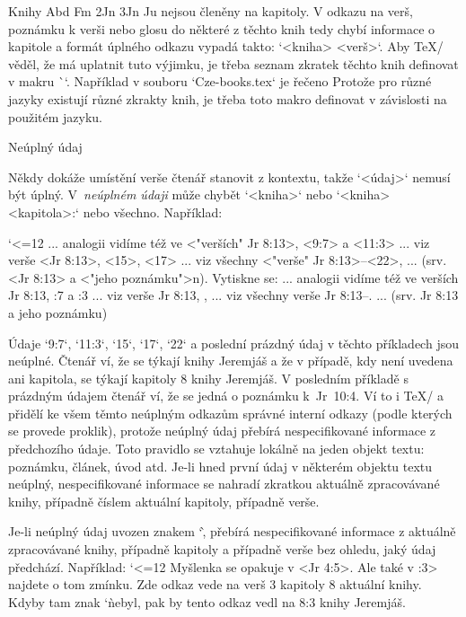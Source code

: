 Knihy Abd Fm 2Jn 3Jn Ju nejsou členěny na kapitoly. V odkazu na verš, poznámku
k verši nebo glosu do některé z těchto knih tedy chybí informace o kapitole
a formát úplného odkazu vypadá takto: `<kniha> <verš>`. Aby \TeX/ věděl, že
má uplatnit tuto výjimku, je třeba seznam zkratek těchto knih definovat v
makru \`\nochapbooks`. Například v souboru `Cze-books.tex` je řečeno
\begtt
\def\nochapbooks{Abd Fm 2Jn 3Jn Ju}
\endtt
Protože pro různé jazyky existují různé zkrakty knih, je třeba toto makro
definovat v závislosti na použitém jazyku.

\secc[nudaj] Neúplný údaj

Někdy dokáže umístění verše čtenář stanovit z kontextu, takže `<údaj>`
nemusí být úplný. V~{\em neúplném údaji} může chybět `<kniha>` nebo
`<kniha> <kapitola>:` nebo všechno. Například:

\begtt \catcode`<=12
... analogii vidíme též ve <"verších" Jr 8:13>, <9:7> a <11:3>
... viz verše <Jr 8:13>, <15>, <17>
... viz všechny <"verše" Jr 8:13>--<22>,
... (srv. <Jr 8:13> a <"jeho poznámku">n).
\endtt
Vytiskne se:
... analogii vidíme též ve {\Blue verších Jr 8:13}, {:7} a {:3}
... viz verše {\Blue Jr 8:13}, {}, {}
... viz všechny {\Blue verše Jr 8:13}--{}.
... (srv. {\Blue Jr 8:13} a {\Blue jeho poznámku})

Údaje `9:7`, `11:3`, `15`, `17`, `22` a poslední prázdný údaj
v těchto příkladech jsou neúplné. Čtenář ví, že se týkají
knihy Jeremjáš a že v případě, kdy není uvedena ani kapitola, se týkají kapitoly 8 knihy
Jeremjáš. V posledním příkladě s prázdným údajem čtenář ví, že se jedná o poznámku
k~Jr~10:4. Ví to i \TeX/ a přidělí ke všem těmto neúplným odkazům správné interní
odkazy (podle kterých se provede proklik), protože neúplný údaj přebírá
nespecifikované informace z předchozího údaje. Toto pravidlo se vztahuje
lokálně na jeden objekt textu: poznámku, článek, úvod atd. Je-li hned první údaj v
některém objektu textu neúplný, nespecifikované informace se nahradí
zkratkou aktuálně zpracovávané knihy, případně číslem aktuální kapitoly,
případně verše.

Je-li neúplný údaj uvozen znakem `\`, přebírá nespecifikované informace z
aktuálně zpracovávané knihy, případně kapitoly a případně verše bez ohledu, jaký údaj
předchází. Například:
\begtt \catcode`<=12
 {} Myšlenka se opakuje v <Jr 4:5>. Ale také v :3> najdete o tom zmínku.
\endtt
Zde odkaz {} vede na verš 3 kapitoly 8 aktuální knihy. Kdyby tam
znak `\` nebyl, pak by tento odkaz vedl na 8:3 knihy Jeremjáš.

